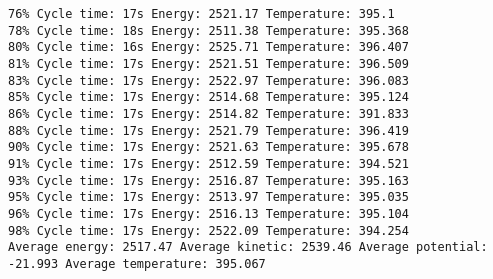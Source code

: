\documentclass{article}
\begin{document}
\begin{verbatim}
76% Cycle time: 17s Energy: 2521.17 Temperature: 395.1
78% Cycle time: 18s Energy: 2511.38 Temperature: 395.368
80% Cycle time: 16s Energy: 2525.71 Temperature: 396.407
81% Cycle time: 17s Energy: 2521.51 Temperature: 396.509
83% Cycle time: 17s Energy: 2522.97 Temperature: 396.083
85% Cycle time: 17s Energy: 2514.68 Temperature: 395.124
86% Cycle time: 17s Energy: 2514.82 Temperature: 391.833
88% Cycle time: 17s Energy: 2521.79 Temperature: 396.419
90% Cycle time: 17s Energy: 2521.63 Temperature: 395.678
91% Cycle time: 17s Energy: 2512.59 Temperature: 394.521
93% Cycle time: 17s Energy: 2516.87 Temperature: 395.163
95% Cycle time: 17s Energy: 2513.97 Temperature: 395.035
96% Cycle time: 17s Energy: 2516.13 Temperature: 395.104
98% Cycle time: 17s Energy: 2522.09 Temperature: 394.254
Average energy: 2517.47 Average kinetic: 2539.46 Average potential: -21.993 Average temperature: 395.067


\end{verbatim}
\end{document}

